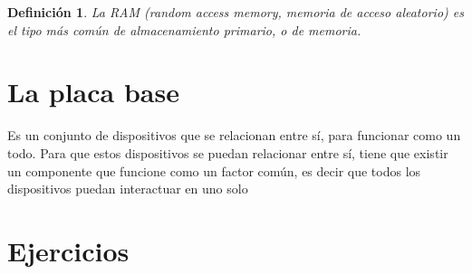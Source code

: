 \documentclass[a4papper, 12pt]{article}
\newtheorem{definition}{Definición}%
\begin{document}
		\begin{definition}
			La RAM (random access memory, memoria de acceso aleatorio) es el tipo más común de almacenamiento primario, o de memoria.
		\end{definition}
		
	\section{La placa base}
		Es un conjunto de dispositivos que se relacionan entre sí, para funcionar como un todo. Para que estos dispositivos se puedan relacionar entre sí, tiene que existir un componente que funcione como un factor común, es decir que todos los dispositivos puedan interactuar en uno solo
	\section{Ejercicios}
\end{document}
